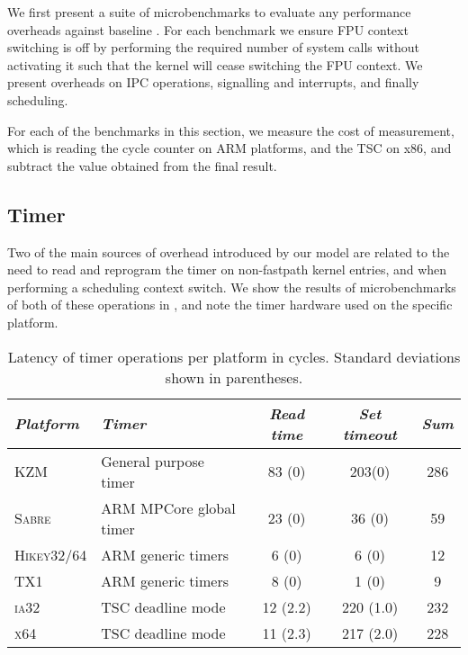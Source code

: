 We first present a suite of microbenchmarks to evaluate any performance overheads against baseline
\selfour.
For each benchmark we ensure \gls{FPU} context switching is off by performing the required number of 
system calls 
without activating it such that the kernel will cease switching the FPU context. We present
overheads on IPC operations, signalling and interrupts, and finally scheduling. 

For each of the benchmarks in this section, we measure the cost of measurement, which is reading the
cycle counter on ARM platforms, and the \gls{TSC} on x86, and subtract the value obtained
from the final result.

\subsection{Timer}
\label{s:eval-timer}

Two of the main sources of overhead introduced by our model are related to the need to read and
reprogram the timer on non-fastpath kernel entries, and when performing a scheduling context switch.
We show the results of microbenchmarks of both of these operations in , and
note the timer hardware used on the specific platform. 

\begin{table}[ht]\centering
{}
\begin{tabularx}{\textwidth}{lXccc}\toprule
    \emph{Platform} & \emph{Timer} & \emph{Read time} & \emph{Set timeout} & \emph{Sum}
    \\\midrule
    \textsc{KZM}               & General purpose timer    & 83 (0)   & 203(0)  & 286   \\
    \textsc{Sabre}             & ARM MPCore global timer  & 23 (0)   & 36 (0)  & 59    \\
    \textsc{Hikey32/64}        & ARM generic timers       &  6 (0)   &  6 (0)  & 12    \\
    \textsc{TX1}               & ARM generic timers       &  8 (0)   &  1 (0)  & 9     \\
    \textsc{ia32}              & TSC deadline mode        & 12 (2.2) & 220 (1.0) & 232 \\
    \textsc{x64}               & TSC deadline mode        & 11 (2.3) & 217 (2.0) & 228 \\
    \bottomrule\hline
\end{tabularx}
\caption{Latency of timer operations per platform in cycles. Standard deviations shown
in parentheses.}
\label{t:evaluation-timer}
\end{table}

